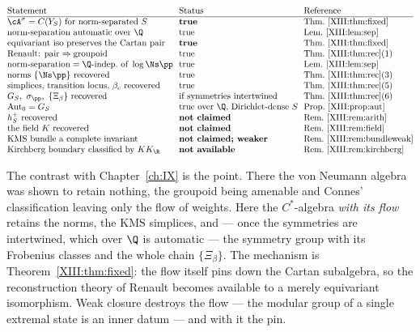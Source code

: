 \[
\begin{array}{@{}l@{\ \ }l@{\ \ }l@{}}
\text{Statement} & \text{Status} & \text{Reference}\\\hline
\cA^\sigma=C(Y_S)\ \text{for norm-separated }S & \textbf{true} & \text{Thm.~\ref{XIII:thm:fixed}}\\
\text{norm-separation automatic over }\Q & \text{true} & \text{Lem.~\ref{XIII:lem:sep}}\\
\text{equivariant iso preserves the Cartan pair} & \textbf{true} & \text{Thm.~\ref{XIII:thm:fixed}}\\
\text{Renault: pair}\Rightarrow\text{groupoid} & \text{true} & \text{Thm.~\ref{XIII:thm:rec}(1)}\\
\text{norm-separation}=\Q\text{-indep.\ of }\log\Ns\pp & \text{true} & \text{Lem.~\ref{XIII:lem:sep}}\\
\text{norms }\{\Ns\pp\}\ \text{recovered} & \text{true} & \text{Thm.~\ref{XIII:thm:rec}(3)}\\
\text{simplices, transition locus, }\beta_c\ \text{recovered} & \text{true} & \text{Thm.~\ref{XIII:thm:rec}(5)}\\
G_S,\ \sigma_\pp,\ \{\Xi_\beta\}\ \text{recovered} & \text{if symmetries intertwined} & \text{Thm.~\ref{XIII:thm:rec}(6)}\\
\operatorname{Aut}_0=G_S & \text{true over }\Q\text{, Dirichlet-dense }S & \text{Prop.~\ref{XIII:prop:aut}}\\
h^+_S\ \text{recovered} & \textbf{not claimed} & \text{Rem.~\ref{XIII:rem:arith}}\\
\text{the field }K\ \text{recovered} & \textbf{not claimed} & \text{Rem.~\ref{XIII:rem:field}}\\
\text{KMS bundle a complete invariant} & \textbf{not claimed; weaker} & \text{Rem.~\ref{XIII:rem:bundleweak}}\\
\text{Kirchberg boundary classified by }KK_\R & \textbf{not available} & \text{Rem.~\ref{XIII:rem:kirchberg}}
\end{array}
\]

The contrast with Chapter~\ref{ch:IX} is the point. There the von Neumann algebra was shown to
retain nothing, the groupoid being amenable and Connes' classification leaving only the flow
of weights. Here the $C^*$-algebra \emph{with its flow} retains the norms, the
$\mathrm{KMS}$ simplices, and --- once the symmetries are intertwined, which over $\Q$ is
automatic --- the symmetry group with its Frobenius classes and the whole chain
$\{\Xi_\beta\}$. The mechanism is
Theorem~\ref{XIII:thm:fixed}: the flow itself pins down the Cartan subalgebra, so the
reconstruction theory of Renault becomes available to a merely equivariant isomorphism. Weak
closure destroys the flow --- the modular group of a single extremal state is an inner
datum --- and with it the pin.

